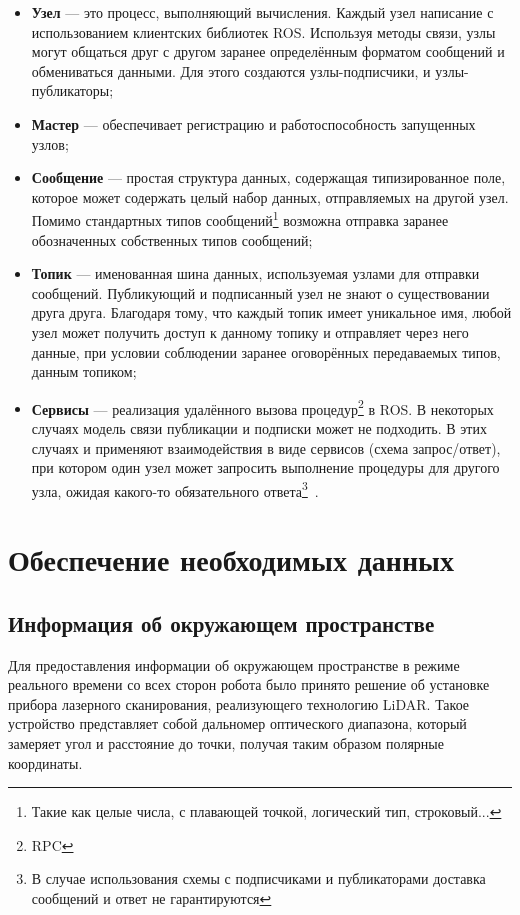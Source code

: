 \begin{itemize}[beginpenalty=10000] %
  \item \textbf{Узел} --- это процесс, выполняющий вычисления. Каждый узел написание с использованием клиентских библиотек ROS. Используя методы связи, узлы могут общаться друг с другом заранее определённым форматом сообщений и обмениваться данными. Для этого создаются узлы-подписчики, и узлы-публикаторы;
  \item \textbf{Мастер} --- обеспечивает регистрацию и работоспособность запущенных узлов;
  \item \textbf{Сообщение} --- простая структура данных, содержащая типизированное поле, которое может содержать целый набор данных, отправляемых на другой узел. Помимо стандартных типов сообщений\footnote{Такие как целые числа, с плавающей точкой, логический тип, строковый...} возможна отправка заранее обозначенных собственных типов сообщений;
  \item \textbf{Топик} --- именованная шина данных, используемая узлами для отправки сообщений. Публикующий и подписанный узел не знают о существовании друга друга. Благодаря тому, что каждый топик имеет уникальное имя, любой узел может получить доступ к данному топику и отправляет через него данные, при условии соблюдении заранее оговорённых передаваемых типов, данным топиком;
  \item \textbf{Сервисы} --- реализация удалённого вызова процедур\footnote{RPC} в ROS. В некоторых случаях модель связи публикации и подписки может не
подходить. В этих случаях и применяют взаимодействия в виде сервисов (схема запрос/ответ), при котором один узел может запросить выполнение процедуры для другого узла, ожидая какого-то обязательного ответа\footnote{В случае использования схемы с подписчиками и публикаторами доставка сообщений и ответ
не гарантируются}~\cite[с.~20]{ros}.
\end{itemize}

\section{Обеспечение необходимых данных}
\subsection{Информация об окружающем пространстве}
Для предоставления информации об окружающем пространстве в режиме реального времени со всех сторон робота было принято решение об установке прибора лазерного сканирования, реализующего технологию LiDAR. Такое устройство представляет собой дальномер оптического диапазона, который замеряет угол и расстояние до точки, получая таким образом полярные координаты.

